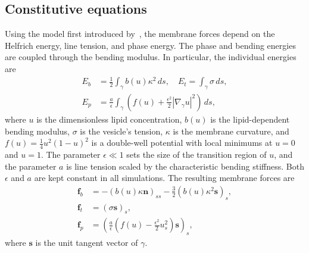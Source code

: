 \documentclass[twoside,twocolumn,9pt]{article}
\newcommand{\ff}{\mathbf{f}}
\newcommand{\nn}{\mathbf{n}}
\renewcommand{\ss}{\mathbf{s}}
\begin{document}
\subsection{Constitutive equations}
Using the model first introduced by~\citet{liu-mar-li-vee-low2017}, the
membrane forces depend on the Helfrich energy, line tension, and phase
energy. The phase and bending energies are coupled through the bending
modulus. In particular, the individual energies are
\begin{align}
  E_b &= \frac{1}{2}\int_{\gamma} b(u) \kappa^2 \, ds, \quad
  E_t = \int_{\gamma} \sigma \, ds, \\
  E_p &= \frac{a}{\epsilon}\int_{\gamma}\left(
  f(u) +\frac{\epsilon^2}{2}|\nabla_\gamma u|^2\right) \, ds,
  \label{eqn:PhaseEnergy}
\end{align}
where $u$ is the dimensionless lipid concentration, $b(u)$ is the
lipid-dependent bending modulus, $\sigma$ is the vesicle's tension,
$\kappa$ is the membrane curvature, and $f(u) = \frac{1}{4}u^2(1-u)^2$
is a double-well potential with local minimums at $u=0$ and $u=1$. The
parameter $\epsilon \ll 1$ sets the size of the transition region of
$u$, and the parameter $a$ is line tension scaled by the characteristic
bending stiffness. Both $\epsilon$ and $a$ are kept constant in all
simulations. The resulting membrane forces are
\begin{align}
  \ff_b &= -(b(u)\kappa \nn)_{ss} -\frac{3}{2}
    \left(b(u) \kappa^2 \ss\right)_s, \\
  \ff_t &= (\sigma \ss)_s, \\
  \ff_p &= \left(\frac{a}{\epsilon}\left(f(u) -
     \frac{\epsilon^2}{2} u_s^2\right) \ss \right)_s,
\end{align}
where $\ss$ is the unit tangent vector of $\gamma$.
\end{document}
